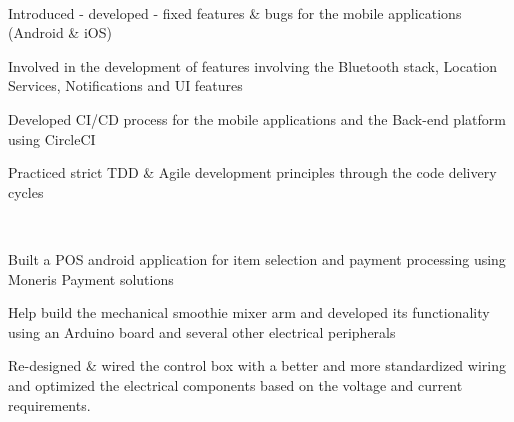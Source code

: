 \documentclass[a4paper]{MagicalCV}
\begin{document}
\begin{minipage}[t]{0.66\textwidth}
 \\
\vspace{\topsep} %
\begin{tightemize}
\item Introduced - developed - fixed features \& bugs for the mobile applications (Android \& iOS)
\item Involved in the development of features involving the Bluetooth stack, Location Services, Notifications and UI features
\item Developed CI/CD process for the mobile applications and the Back-end platform using CircleCI
\item Practiced strict TDD \& Agile development principles through the code delivery cycles
\end{tightemize}
\sectionsep

 \\
\vspace{\topsep} %
\begin{tightemize}
\item Built a POS android application for item selection and payment processing using Moneris Payment solutions
\item Help build the mechanical smoothie mixer arm and developed its functionality using an Arduino board and several other electrical peripherals
\item Re-designed \& wired the control box with a better and more standardized wiring and optimized the electrical components based on the voltage and current requirements.
\end{tightemize}
\sectionsep

\end{minipage} 
\end{document}
